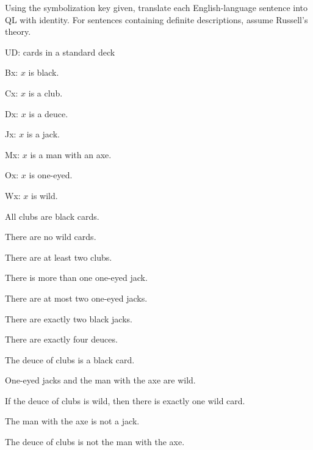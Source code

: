 \solutions
\problempart
\label{pr.QL-ID-cards}
Using the symbolization key given, translate each English-language sentence into QL with identity. For sentences containing definite descriptions, assume Russell's theory.
\begin{ekey}
\item[UD:] cards in a standard deck
\item[Bx:] $x$ is black.
\item[Cx:] $x$ is a club.
\item[Dx:] $x$ is a deuce.
\item[Jx:] $x$ is a jack.
\item[Mx:] $x$ is a man with an axe.
\item[Ox:] $x$ is one-eyed.
\item[Wx:] $x$ is wild.
\end{ekey}
\begin{earg}
\item All clubs are black cards.
\item There are no wild cards.
\item There are at least two clubs.
\item There is more than one one-eyed jack.
\item There are at most two one-eyed jacks.
\item There are exactly two black jacks.
\item There are exactly four deuces.
\item The deuce of clubs is a black card.
\item One-eyed jacks and the man with the axe are wild.
\item If the deuce of clubs is wild, then there is exactly one wild card.
\item The man with the axe is not a jack.
\item The deuce of clubs is not the man with the axe.
\end{earg}

